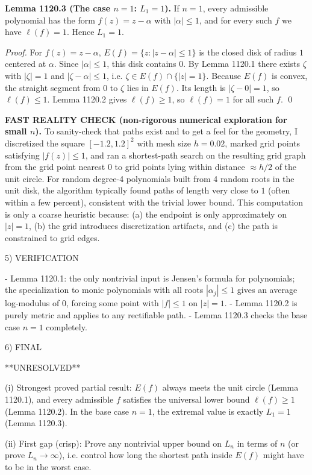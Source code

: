 \textbf{Lemma 1120.3 (The case \(n=1\): \(L_1=1\)).}
If \(n=1\), every admissible polynomial has the form \(f(z)=z-\alpha\) with \(|\alpha|\le 1\), and for every such \(f\) we have \(\ell(f)=1\). Hence \(L_1=1\).

\emph{Proof.}
For \(f(z)=z-\alpha\),
\(E(f)=\{z:|z-\alpha|\le 1\}\) is the closed disk of radius \(1\) centered at \(\alpha\). Since \(|\alpha|\le 1\), this disk contains \(0\).
By Lemma 1120.1 there exists \(\zeta\) with \(|\zeta|=1\) and \(|\zeta-\alpha|\le 1\), i.e. \(\zeta\in E(f)\cap\{|z|=1\}\).
Because \(E(f)\) is convex, the straight segment from \(0\) to \(\zeta\) lies in \(E(f)\). Its length is \(|\zeta-0|=1\), so \(\ell(f)\le 1\). Lemma 1120.2 gives \(\ell(f)\ge 1\), so \(\ell(f)=1\) for all such \(f\). \qed

\textbf{FAST REALITY CHECK (non-rigorous numerical exploration for small \(n\)).}
To sanity-check that paths exist and to get a feel for the geometry, I discretized the square \([-1.2,1.2]^2\) with mesh size \(h=0.02\), marked grid points satisfying \(|f(z)|\le 1\), and ran a shortest-path search on the resulting grid graph from the grid point nearest \(0\) to grid points lying within distance \(\approx h/2\) of the unit circle. For random degree-4 polynomials built from 4 random roots in the unit disk, the algorithm typically found paths of length very close to \(1\) (often within a few percent), consistent with the trivial lower bound. This computation is only a coarse heuristic because:
(a) the endpoint is only approximately on \(|z|=1\),
(b) the grid introduces discretization artifacts, and
(c) the path is constrained to grid edges.

5) VERIFICATION

- Lemma 1120.1: the only nontrivial input is Jensen's formula for polynomials; the specialization to monic polynomials with all roots \(|\alpha_j|\le 1\) gives an average log-modulus of \(0\), forcing some point with \(|f|\le 1\) on \(|z|=1\).
- Lemma 1120.2 is purely metric and applies to any rectifiable path.
- Lemma 1120.3 checks the base case \(n=1\) completely.

6) FINAL

**UNRESOLVED**

(i) Strongest proved partial result: \(E(f)\) always meets the unit circle (Lemma 1120.1), and every admissible \(f\) satisfies the universal lower bound \(\ell(f)\ge 1\) (Lemma 1120.2). In the base case \(n=1\), the extremal value is exactly \(L_1=1\) (Lemma 1120.3).

(ii) First gap (crisp): Prove any nontrivial upper bound on \(L_n\) in terms of \(n\) (or prove \(L_n\to\infty\)), i.e. control how long the shortest path inside \(E(f)\) might have to be in the worst case.


